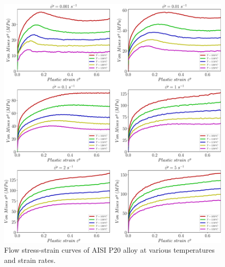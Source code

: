 \documentclass[twoside,english,1p,final,sort&compress]{elsarticle}
\theoremstyle{plain}
\begin{document}
\begin{figure}[!ht]
\centering
\includegraphics[width=1.02\columnwidth]{Figures/rawData}
\caption{Flow stress-strain curves of AISI P20 alloy at various temperatures and strain rates.}
\label{fig:rawData}
\end{figure}
\end{document}
